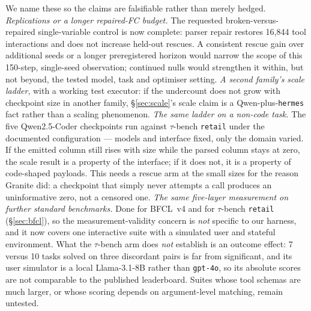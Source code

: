We name these so the claims are falsifiable rather than merely hedged.
\emph{Replications or a longer repaired-FC budget.} The requested broken-versus-repaired
single-variable control is now complete: parser repair restores 16{,}844 tool interactions and
does not increase held-out rescues. A consistent rescue gain over additional seeds or a longer
preregistered horizon would narrow the scope of this 150-step, single-seed observation; continued
nulls would strengthen it within, but not beyond, the tested model, task and optimiser setting.
\emph{A second family's scale ladder}, with a working test executor: if the undercount does not
grow with checkpoint size in another family, \S\ref{sec:scale}'s scale claim is a
Qwen-plus-\texttt{hermes} fact rather than a scaling phenomenon.
\emph{The same ladder on a non-code task.} The five Qwen2.5-Coder checkpoints run against
$\tau$-bench \texttt{retail} under the documented configuration --- models and interface fixed,
only the domain varied. If the emitted column still rises with size while the parsed column stays
at zero, the scale result is a property of the interface; if it does not, it is a property of
code-shaped payloads. This needs a rescue arm at the small sizes for the reason Granite did: a
checkpoint that simply never attempts a call produces an uninformative zero, not a censored one.
\emph{The same five-layer measurement on further standard benchmarks.} Done for BFCL~v4 and for
$\tau$-bench \texttt{retail} (\S\ref{sec:bfcl}), so the measurement-validity concern is
\emph{not} specific to our harness, and it now covers one interactive suite with a simulated user
and stateful environment. What the $\tau$-bench arm does \emph{not} establish is an outcome
effect: 7 versus 10 tasks solved on three discordant pairs is far from significant, and its user
simulator is a local Llama-3.1-8B rather than \texttt{gpt-4o}, so its absolute scores are not
comparable to the published leaderboard. Suites whose tool schemas are much larger, or whose
scoring depends on argument-level matching, remain untested.

